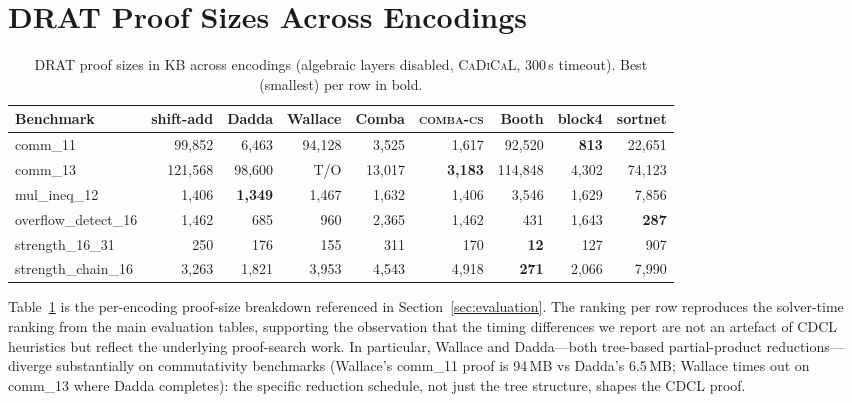 \documentclass[a4paper]{ceurart}
\newcommand{\combacs}{\textsc{comba-cs}\xspace}
\newcommand{\cadical}{\textsc{CaDiCaL}\xspace}
\begin{document}
\section{DRAT Proof Sizes Across Encodings}
\label{app:proof-sizes}

\begin{table}[ht]
\caption{DRAT proof sizes in KB across encodings (algebraic layers
  disabled, \cadical, 300\,s timeout). Best (smallest) per row in bold.}
\label{tab:proof-sizes}
\centering
\small
\setlength{\tabcolsep}{4pt}
\begin{tabular}{lrrrrrrrr}
\toprule
Benchmark & shift-add & Dadda & Wallace & Comba & \combacs & Booth & block4 & sortnet \\
\midrule
comm\_11 & 99,852 & 6,463 & 94,128 & 3,525 & 1,617 & 92,520 & \textbf{813} & 22,651 \\
comm\_13 & 121,568 & 98,600 & T/O & 13,017 & \textbf{3,183} & 114,848 & 4,302 & 74,123 \\
mul\_ineq\_12 & 1,406 & \textbf{1,349} & 1,467 & 1,632 & 1,406 & 3,546 & 1,629 & 7,856 \\
overflow\_detect\_16 & 1,462 & 685 & 960 & 2,365 & 1,462 & 431 & 1,643 & \textbf{287} \\
strength\_16\_31 & 250 & 176 & 155 & 311 & 170 & \textbf{12} & 127 & 907 \\
strength\_chain\_16 & 3,263 & 1,821 & 3,953 & 4,543 & 4,918 & \textbf{271} & 2,066 & 7,990 \\
\bottomrule
\end{tabular}
\end{table}

Table~\ref{tab:proof-sizes} is the per-encoding proof-size
breakdown referenced in Section~\ref{sec:evaluation}. The
ranking per row reproduces the solver-time ranking from the main
evaluation tables, supporting the observation that the timing
differences we report are not an artefact of CDCL heuristics but
reflect the underlying proof-search work. In particular, Wallace
and Dadda---both tree-based partial-product reductions---diverge
substantially on commutativity benchmarks (Wallace's comm\_11
proof is 94\,MB vs Dadda's 6.5\,MB; Wallace times out on comm\_13
where Dadda completes): the specific reduction schedule, not
just the tree structure, shapes the CDCL proof.
\end{document}
